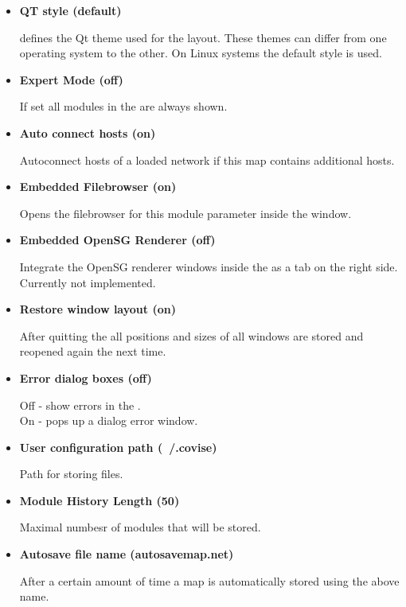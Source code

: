    \begin{itemize}
   
   \item{\bf QT style (default)}
   
   defines the Qt theme used for the layout. These themes can differ from one operating system 
   to the other. On Linux systems the default style is used.
   
   \item{\bf Expert Mode (off)}
   
   If set all modules in the {\mymodulebrowser} are always shown.
   
   \item{\bf Auto connect hosts (on)}
   
   Autoconnect hosts of a loaded network if this map contains additional hosts.
   
   \item{\bf Embedded Filebrowser (on)}
   
   Opens the filebrowser for this module parameter inside the {\myparameter} window.
   
   \item{\bf Embedded OpenSG Renderer (off)}
   
   Integrate the OpenSG renderer windows inside the {\mapeditor} as a tab on the right side. Currently not implemented.
   
   \item{\bf Restore window layout (on)}
   
   After quitting the {\mapeditor} all positions and sizes of all windows are stored and reopened again the next time. 
   
   \item{\bf Error dialog boxes (off)}
   
   Off - show errors in the {\mymessagearea}. \\
   On  - pops up a dialog error window.
   
   \item{\bf User configuration path (~/.covise) }
   
   Path for storing files.
   
   \item{\bf Module History Length (50)}
   
   Maximal numbesr of modules that will be stored.
   
   \item{\bf Autosave file name (autosavemap.net)}
   
   After a certain amount of time a map is automatically stored using the above name.
   

\end{itemize}
